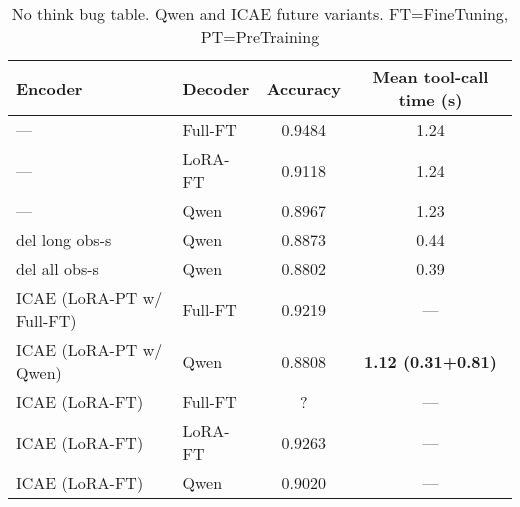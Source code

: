 \documentclass{article}
\begin{document}
\begin{table}[h]
    \centering
    \setlength{\tabcolsep}{6pt}
    \begin{tabular}{llcc}
        \toprule
        \textbf{Encoder} & \textbf{Decoder} & \textbf{Accuracy} & \textbf{Mean tool-call time (s)} \\
        \midrule
        —                        & Full-FT   & 0.9484 & 1.24 \\
        —                        & LoRA-FT   & 0.9118 & 1.24 \\
        —                        & Qwen           & 0.8967 & 1.23 \\
        \addlinespace
        del long obs-s             & Qwen           & 0.8873 & 0.44 \\
        del all obs-s              & Qwen           & 0.8802 & 0.39 \\
        \addlinespace
        ICAE (LoRA-PT w/ Full-FT)   & Full-FT   &  0.9219    &  — \\
        ICAE (LoRA-PT w/ Qwen)    & Qwen           &  0.8808 & \textbf{1.12 (0.31+0.81)} \\
        \addlinespace
        ICAE (LoRA-FT)         & Full-FT   &  ?   & —  \\
        ICAE (LoRA-FT)         & LoRA-FT   & 0.9263   & —  \\
        ICAE (LoRA-FT)         & Qwen           & 0.9020 & — \\

        
        \bottomrule
    \end{tabular}
    \caption{No think bug table. Qwen and ICAE future variants. FT=FineTuning, PT=PreTraining}
    \label{tab:icae_variants}
\end{table}

\newpage
\newpage
\end{document}
